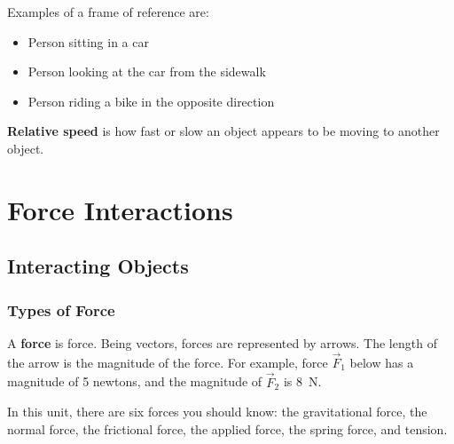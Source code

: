 \documentclass[dvipsnames]{article}
\newif\ifShowUnitII                              %
\begin{document}
Examples of a frame of reference are:

\begin{itemize}[itemsep=0pt,topsep=0pt]
    \item Person sitting in a car
    \item Person looking at the car from the sidewalk
    \item Person riding a bike in the opposite direction
\end{itemize}

\textbf{Relative speed} is how fast or slow an object appears to be moving to another object.




\fi

\clearpage

\section{Force Interactions}

\ifShowUnitII
\setcounter{example}{0}

\subsection{Interacting Objects}

\subsubsection{Types of Force}

A \textbf{\gls{force}} is \glsdesc{force}. Being vectors, forces are represented by arrows. The length of the arrow is the magnitude of the force. For example, force $\vec{F}_1$ below has a magnitude of 5 newtons, and the magnitude of $\vec{F}_2$ is \SI{8}{N}.

\begin{center}
\end{center}

In this unit, there are six forces you should know: the gravitational force, the normal force, the frictional force, the applied force, the spring force, and tension.
\end{document}
